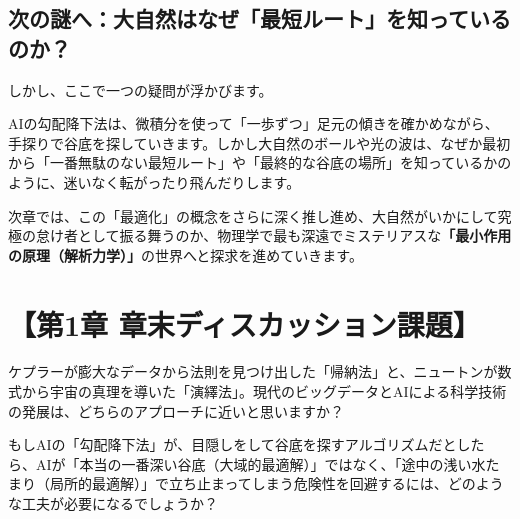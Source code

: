 \subsection{次の謎へ：大自然はなぜ「最短ルート」を知っているのか？}

しかし、ここで一つの疑問が浮かびます。

AIの勾配降下法は、微積分を使って「一歩ずつ」足元の傾きを確かめながら、手探りで谷底を探していきます。しかし大自然のボールや光の波は、なぜか最初から「一番無駄のない最短ルート」や「最終的な谷底の場所」を知っているかのように、迷いなく転がったり飛んだりします。

次章では、この「最適化」の概念をさらに深く推し進め、大自然がいかにして究極の怠け者として振る舞うのか、物理学で最も深遠でミステリアスな\textbf{「最小作用の原理（解析力学）」}の世界へと探求を進めていきます。

\section*{【第1章 章末ディスカッション課題】}

ケプラーが膨大なデータから法則を見つけ出した「帰納法」と、ニュートンが数式から宇宙の真理を導いた「演繹法」。現代のビッグデータとAIによる科学技術の発展は、どちらのアプローチに近いと思いますか？

もしAIの「勾配降下法」が、目隠しをして谷底を探すアルゴリズムだとしたら、AIが「本当の一番深い谷底（大域的最適解）」ではなく、「途中の浅い水たまり（局所的最適解）」で立ち止まってしまう危険性を回避するには、どのような工夫が必要になるでしょうか？




